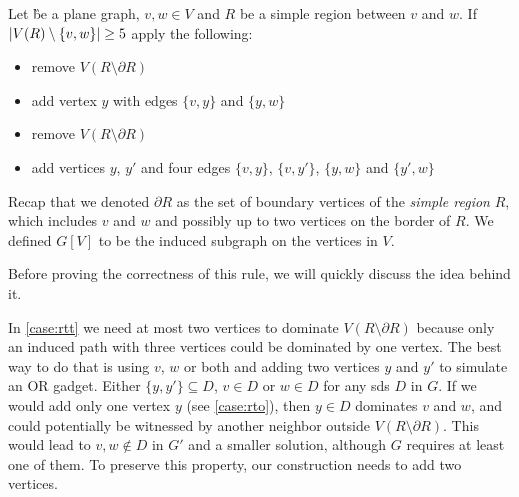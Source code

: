 \begin{rgl}\label{rgl:rthree}
    Let \G be a plane graph, $v, w \in V$ and $R$ be a simple region between $v$ and $w$. If $\abs{V(R) \setminus \{v, w\}} \geq 5$ apply the following:

    \begin{caseof}

            \vspace{-5mm}
            \begin{itemize}
                    \item remove $V(R\setminus\partial R)$
                    \item add vertex $y$ with edges $\{v, y\}$ and $\{y, w\}$
            \end{itemize}

            \vspace{-5mm}
            \begin{itemize}
                    \item remove $V(R\setminus\partial R)$
                    \item add vertices $y$, $y'$ and four edges $\{v,y\}$, $\{v, y'\}$, $\{y, w\}$ and $\{y', w\}$
            \end{itemize}
        \end{caseof}
Recap that we denoted $\partial R$ as the set of boundary vertices of the  \textit{simple region} $R$, which includes $v$ and $w$ and possibly up to two vertices on the border of $R$. 
We defined $G[V]$ to be the induced subgraph on the vertices in $V$.

\end{rgl}
Before proving the correctness of this rule, we will quickly discuss the idea behind it.

In \cref{case:rtt} we need at most two vertices to dominate $V(R \setminus \partial R)$ because only an induced path with three vertices could be dominated by one vertex.
The best way to do that is using $v$, $w$ or both and adding two vertices $y$ and $y'$ to simulate an $\mathrm{OR}$ gadget.
Either $\{y,y'\} \subseteq D$, $v \in D$ or $w \in D$ for any sds $D$ in $G$.
If we would add only one vertex $y$ (see \cref{case:rto}), then $y \in D$ dominates $v$ and $w$, and could potentially be witnessed by another neighbor outside $V(R \setminus \partial R)$.
This would lead to $v,w \notin D$ in $G'$ and a smaller solution, although $G$ requires at least one of them.
To preserve this property, our construction needs to add two vertices.

